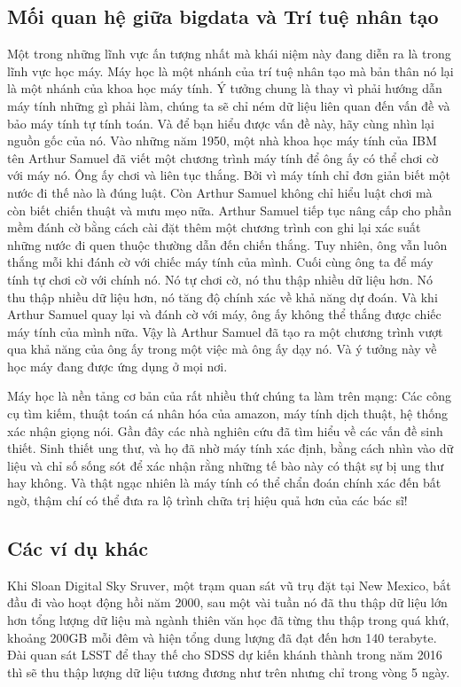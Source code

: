 \documentclass[12pt]{report}
\begin{document}
\subsection{Mối quan hệ giữa bigdata và Trí tuệ nhân tạo}
Một trong những lĩnh vực ấn tượng nhất mà khái niệm này đang diễn ra là trong lĩnh vực học máy. Máy học là một nhánh của trí tuệ nhân tạo mà bản thân nó lại là một nhánh của khoa học máy tính. Ý tưởng chung là thay vì phải hướng dẫn máy tính những gì phải làm, chúng ta sẽ chỉ ném dữ liệu liên quan đến vấn đề và bảo máy tính tự tính toán. Và để bạn hiểu được vấn đề này, hãy cùng nhìn lại nguồn gốc của nó. Vào những năm 1950, một nhà khoa học máy tính của IBM tên Arthur Samuel đã viết một chương trình máy tính để ông ấy có thể chơi cờ với máy nó. Ông ấy chơi và liên tục thắng. Bởi vì máy tính chỉ đơn giản biết một nước đi thế nào là đúng luật. Còn Arthur Samuel không chỉ hiểu luật chơi mà còn biết chiến thuật và mưu mẹo nữa. Arthur Samuel tiếp tục nâng cấp cho phần mềm đánh cờ bằng cách cài đặt thêm một chương trình con ghi lại xác suất những nước đi quen thuộc thường dẫn đến chiến thắng. Tuy nhiên, ông vẫn luôn thắng mỗi khi đánh cờ với chiếc máy tính của mình. Cuối cùng ông ta để máy tính tự chơi cờ với chính nó. Nó tự chơi cờ, nó thu thập nhiều dữ liệu hơn. Nó thu thập nhiều dữ liệu hơn, nó tăng độ chính xác về khả năng dự đoán. Và khi Arthur Samuel quay lại và đánh cờ với máy, ông ấy không thể thắng được chiếc máy tính của mình nữa. Vậy là Arthur Samuel đã tạo ra một chương trình vượt qua khả năng của ông ấy trong một việc mà ông ấy dạy nó. Và ý tưởng này về học máy đang được ứng dụng ở mọi nơi. 

Máy học là nền tảng cơ bản của rất nhiều thứ chúng ta làm trên mạng: Các công cụ tìm kiếm, thuật toán cá nhân hóa của amazon, máy tính dịch thuật, hệ thống xác nhận giọng nói. Gần đây các nhà nghiên cứu đã tìm hiểu về các vấn đề sinh thiết. Sinh thiết ung thư, và họ đã nhờ máy tính xác định, bằng cách nhìn vào dữ liệu và chỉ số sống sót để xác nhận rằng những tế bào này có thật sự bị ung thư hay không. Và thật ngạc nhiên là máy tính có thể chẩn đoán chính xác đến bất ngờ, thậm chí có thể đưa ra lộ trình chữa trị hiệu quả hơn của các bác sĩ!

\subsection{Các ví dụ khác}
Khi Sloan Digital Sky Sruver, một trạm quan sát vũ trụ đặt tại New Mexico, bắt đầu đi vào hoạt động hồi năm 2000, sau một vài tuần nó đã thu thập dữ liệu lớn hơn tổng lượng dữ liệu mà ngành thiên văn học đã từng thu thập trong quá khứ, khoảng 200GB mỗi đêm và hiện tổng dung lượng đã đạt đến hơn 140 terabyte. Đài quan sát LSST để thay thế cho SDSS dự kiến khánh thành trong năm 2016 thì sẽ thu thập lượng dữ liệu tương đương như trên nhưng chỉ trong vòng 5 ngày.
\end{document}
